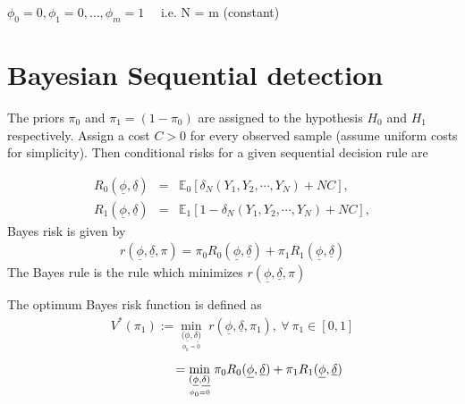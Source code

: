\documentclass[12pt]{report}
\begin{document}
\begin{center}
	$\phi_0=0,\phi_1=0, \dots, \phi_m = 1$ \ \ i.e. N = m (constant)\\
\end{center}
\section{Bayesian Sequential detection}
The priors $\pi_0$ and $\pi_1=(1-\pi_0)$ are assigned to the hypothesis $H_0$ and $H_1$ respectively. Assign a
cost $C>0$ for every observed sample (assume uniform costs for simplicity). Then conditional risks for a given sequential decision rule are

\begin{eqnarray}
R_0(\underline{\phi},\underline{\delta}) &=& \mathbb{E}_0[\delta_N(Y_1,Y_2,\cdots,Y_N)+NC],\\
R_1(\underline{\phi},\underline{\delta}) &=& \mathbb{E}_1[1-\delta_N(Y_1,Y_2,\cdots,Y_N)+NC],
\end{eqnarray}
Bayes risk is given by
\begin{eqnarray}
r(\underline{\phi},\underline{\delta},\pi)=\pi_0R_0(\underline{\phi},\underline{\delta})+\pi_1R_1(\underline{\phi},\underline{\delta})
\end{eqnarray}
The Bayes rule is the rule which minimizes 
$r(\underline{\phi},\underline{\delta},\pi)$
\begin{defn}
	The optimum Bayes risk function is defined as
	\begin{eqnarray}
	V^*(\pi_1):=\underset{\underset{\phi_0=0}{(\underline{\phi},\underline{\delta)}}}
	\min\;r(\underline{\phi},\underline{\delta},\pi_1),\  \forall\  \pi_1\in[0,1]
	\end{eqnarray}
	\begin{eqnarray}
		   \hspace{15mm}=\underset{\underset{\phi_0=0}{(\underline{\phi},\underline{\delta)}}}
	\min\;\pi_0R_0(\underline{\phi},\underline{\delta})+\pi_1R_1(\underline{\phi},\underline{\delta})
	\end{eqnarray}
\end{defn}
\end{document}

